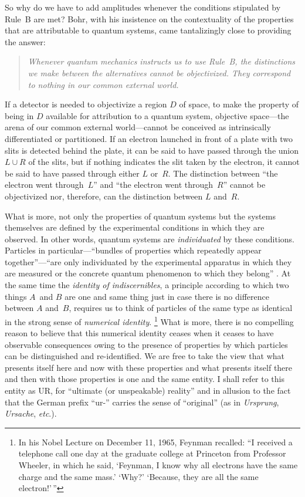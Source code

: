 \documentclass[12pt]{article}
\newcommand{\bq}{\begin{quote}}
\newcommand{\eq}{\end{quote}}
\begin{document}
So why do we have to add amplitudes whenever the conditions stipulated by Rule~B are met? Bohr, with his insistence on the contextuality of the properties that are attributable to quantum systems, came tantalizingly close to providing the answer:
\bq
\emph{Whenever quantum mechanics instructs us to use Rule~B, the distinctions we make between the alternatives cannot be objectivized. They correspond to nothing in our common external world.}
\eq
If a detector is needed to objectivize a region $D$ of space, to make the property of being in $D$ available for attribution to a quantum system, objective space---the arena of our common external world---cannot be conceived as {intrinsically} differentiated or partitioned. If an electron launched in front of a plate with two slits is detected behind the plate, it can be said to have passed through the union $L\cup R$ of the slits, but if nothing indicates the slit taken by the electron, it cannot be said to have passed through either $L$ or~$R$. The distinction between ``the electron went through~$L$'' and ``the electron went through~$R$'' cannot be objectivized nor, therefore, can the distinction between $L$ and~$R$.

What is more, not only the properties of quantum systems but the systems themselves are defined by the experimental conditions in which they are observed. In other words, quantum systems are \emph{individuated} by these conditions. Particles in particular---``bundles of properties which repeatedly appear together''---``are only individuated by the experimental apparatus in which they are measured or the concrete quantum phenomenon to which they belong'' \cite{Falk2007b}. At the same time the \textit{identity of indiscernibles}, a principle according to which two things $A$~and $B$ are one and same thing just in case there is no difference between $A$ and~$B$, requires us to think of particles of the same type as identical in the strong sense of \emph{numerical identity}.%
\footnote{In his Nobel Lecture  on December 11, 1965, Feynman recalled: ``I received a telephone call one day at the graduate college at Princeton from Professor Wheeler, in which he said, `Feynman, I know why all electrons have the same charge and the same mass.' `Why?' `Because, they are all the same electron!'\,''}
What is more, there is no compelling reason to believe that this {numerical} identity ceases when it ceases to have observable consequences owing to the presence of properties by which particles can be distinguished and re-identified. We are free to take the view that what presents itself here and now with these properties and what presents itself there and then with those properties is one and the same entity. I shall refer to this entity as UR, for ``ultimate (or unspeakable) reality'' and in allusion to the fact that the German prefix ``ur-'' carries the sense of ``original'' (as in \emph{Ursprung}, \emph{Ursache}, \emph{etc}.).
\end{document}
